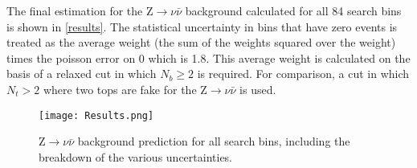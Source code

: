 The final estimation for the Z$\rightarrow\nu\bar{\nu}$ background calculated for all 84 search bins is shown in \autoref{results}. The statistical uncertainty in bins that have zero events is treated as the average weight (the sum of the weights squared over the weight) times the poisson error on 0 which is 1.8. This average weight is calculated on the basis of a relaxed cut in which $N_b \geq 2$ is required. For comparison, a cut in which $N_t > 2$ where two tops are fake for the Z$\rightarrow\nu\bar{\nu}$ is used.

\begin{figure}[H]
\begin{center}
\texttt{[image: Results.png]}
\end{center}
\vspace{-1em}
\caption{Z$\rightarrow\nu\bar{\nu}$ background prediction for all search bins, including the breakdown of the various uncertainties.}
\label{results}
\end{figure}

